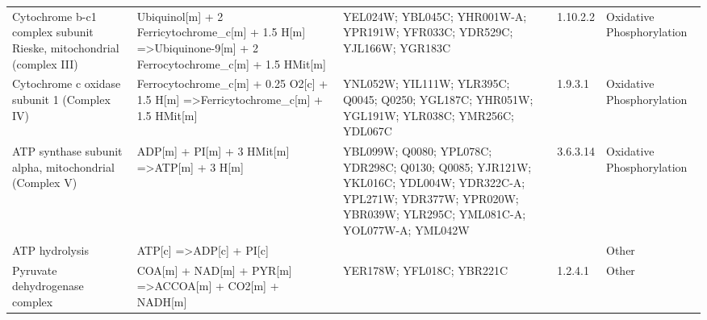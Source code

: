 {\begin{landscape}
\begin{longtable}{p{.25\linewidth} | p{.40\linewidth} | p{.19\linewidth} | p{.05\linewidth} | p{.10\linewidth}}
Cytochrome b-c1 complex subunit Rieske, mitochondrial (complex III)                       & Ubiquinol{[}m{]} + 2 Ferricytochrome\_c{[}m{]} + 1.5 H{[}m{]} =\textgreater Ubiquinone-9{[}m{]} + 2 Ferrocytochrome\_c{[}m{]} + 1.5 HMit{[}m{]} & YEL024W; YBL045C; YHR001W-A; YPR191W; YFR033C; YDR529C; YJL166W; YGR183C                                                                                         & 1.10.2.2           & Oxidative Phosphorylation                                                   \\
Cytochrome c oxidase subunit 1 (Complex IV)                                               & Ferrocytochrome\_c{[}m{]} + 0.25 O2{[}c{]} + 1.5 H{[}m{]} =\textgreater Ferricytochrome\_c{[}m{]} + 1.5 HMit{[}m{]}                             & YNL052W; YIL111W; YLR395C; Q0045; Q0250; YGL187C; YHR051W; YGL191W; YLR038C; YMR256C; YDL067C                                                                    & 1.9.3.1            & Oxidative Phosphorylation                                                   \\
ATP synthase subunit alpha, mitochondrial (Complex V)                                     & ADP{[}m{]} + PI{[}m{]} + 3 HMit{[}m{]} =\textgreater ATP{[}m{]} + 3 H{[}m{]}                                                                    & YBL099W; Q0080; YPL078C; YDR298C; Q0130; Q0085; YJR121W; YKL016C; YDL004W; YDR322C-A; YPL271W; YDR377W; YPR020W; YBR039W; YLR295C; YML081C-A; YOL077W-A; YML042W & 3.6.3.14           & Oxidative Phosphorylation                                                   \\
ATP hydrolysis                                                                            & ATP{[}c{]} =\textgreater ADP{[}c{]} + PI{[}c{]}                                                                                                 &                                                                                                                                                                  &                    & Other                                                                       \\
Pyruvate dehydrogenase complex                                                            & COA{[}m{]} + NAD{[}m{]} + PYR{[}m{]} =\textgreater ACCOA{[}m{]} + CO2{[}m{]} + NADH{[}m{]}                                                      & YER178W; YFL018C; YBR221C                                                                                                                                        & 1.2.4.1            & Other                                                                       \\

\end{longtable}
\end{landscape}}
